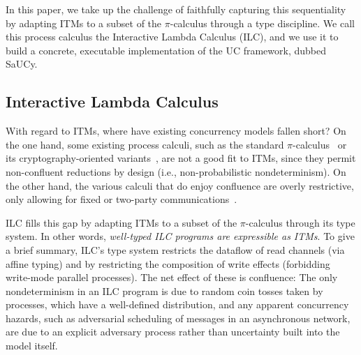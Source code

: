 In this paper, we take up the challenge of faithfully capturing this
sequentiality by adapting ITMs to a subset of the $\pi$-calculus through a type
discipline. We call this process calculus the Interactive Lambda Calculus (ILC),
and we use it to build a concrete, executable implementation of the UC
framework, dubbed SaUCy.


\subsection{Interactive Lambda Calculus}

With regard to ITMs, where have existing concurrency models fallen short? On the
one hand, some existing process calculi, such as the standard
$\pi$-calculus~\cite{milner1999communicating} or its cryptography-oriented
variants~\cite{abadi1999calculus, abadi2001mobile}, are not a good fit to ITMs,
since they permit non-confluent reductions by design (i.e., non-probabilistic
nondeterminism).
On the other hand, the various calculi that do enjoy confluence are overly
restrictive, only allowing for fixed or two-party
communications~\cite{kobayashi1999linearity,bohl2016symbolic,fowler2018session}.

ILC fills this gap by adapting ITMs to a subset of the $\pi$-calculus through its
type system. In other words, \emph{well-typed ILC programs are expressible as
  ITMs}. To give a brief summary, ILC's type system restricts the dataflow of
read channels (via affine typing) and by restricting the composition of write
effects (forbidding write-mode parallel processes). The net effect of these is
confluence:  The only nondeterminism in an ILC program is due to random coin
tosses taken by processes, which have a well-defined distribution, and any
apparent concurrency hazards, such as adversarial scheduling of messages in an
asynchronous network, are due to an explicit adversary process rather than
uncertainty built into the model itself.

